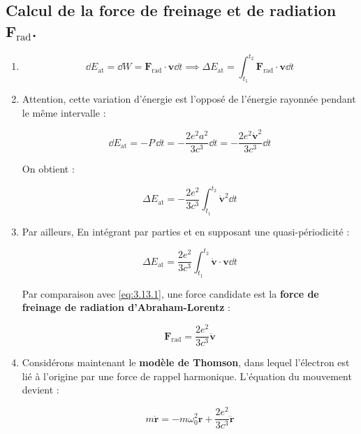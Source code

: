 \documentclass[a4paper,10pt]{report}
\begin{document}
\subsection{Calcul de la force de freinage et de radiation $\textbf{F}_\text{rad}$.}
\begin{enumerate}
	\item \begin{equation}
		\dd E_\text{at} = \dd W = \textbf{F}_{\text{rad}} \cdot \textbf{v} \dd t \implies \Delta E_{\text{at}} = \int_{t_1}^{t_2} \textbf{F}_\text{rad} \cdot \textbf{v} \dd t \tag{4.13.1} \label{eq:4.13.1}
			\end{equation}
		\item Attention, cette variation d'énergie est l'opposé de l'énergie rayonnée pendant le même intervalle :
		
		\begin{equation}
			\dd E_{\text{at}} = -P \, \dd t = -\frac{2 e^2 a^2}{3 c^3} \dd t = -\frac{2 e^2 \dot{\textbf{v}}^2}{3 c^3} \dd t \tag{4.13.2} \label{eq:4.13.2}
		\end{equation}
		
		On obtient :
		
		\begin{equation}
			\Delta E_{\text{at}} = - \frac{2 e^2}{3 c^3} \int_{t_1}^{t_2} \dot{\textbf{v}}^2 \dd t \tag{4.13.3}\label{eq:4.13.3}
		\end{equation}
		\item 	Par ailleurs, 
		En intégrant par parties et en supposant une quasi-périodicité :
		
		\begin{equation}
			\Delta E_{\text{at}} = \frac{2 e^2}{3 c^3} \int_{t_1}^{t_2} \ddot{\textbf{v}} \cdot \textbf{v} \dd t \tag{4.13.4}
		\end{equation}
		
		Par comparaison avec \ref{eq:3.13.1}, une force candidate est la \textbf{force de freinage de radiation d’Abraham-Lorentz} :
		
		\begin{equation}
			\textbf{F}_{\text{rad}} = \frac{2 e^2}{3 c^3} \ddot{\textbf{v}} \tag{4.13.5}
		\end{equation}
		\item Considérons maintenant le \textbf{modèle de Thomson}, dans lequel l’électron est lié à l'origine par une force de rappel harmonique. L'équation du mouvement devient :
		
		\begin{equation}
			m \ddot{\textbf{r}} = - m \omega_0^2 \textbf{r} + \frac{2 e^2}{3 c^3} \dddot{\textbf{r}} \tag{4.13.6}
		\end{equation}
		

\end{enumerate}
\end{document}

